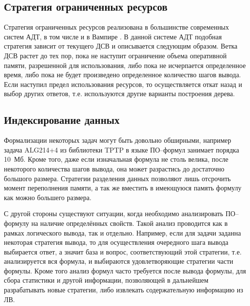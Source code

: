 

\subsection{Стратегия ограниченных ресурсов}
Стратегия ограниченных ресурсов реализована в большинстве современных систем АДТ, в том числе и в Вампире \cite{}. В данной системе АДТ подобная стратегия  зависит от текущего ДСВ и описывается следующим образом. Ветка ДСВ растет до тех пор, пока не наступит ограничение объема оперативной памяти, разрешенной для использования, либо пока не исчерпается определенное время, либо пока не будет произведено определенное количество шагов вывода. Если наступил предел использования ресурсов, то осуществляется откат назад и выбор других ответов, т.е. используются другие варианты построения дерева.

\subsection{Индексирование данных}

Формализации некоторых задач могут быть довольно обширными, например задача ALG214+4 из библиотеки TPTP в языке ПО--формул занимает порядка 10~Мб. Кроме того, даже если изначальная формула не столь велика, после некоторого количества шагов вывода, она может разрастись до достаточно большого размера. Стратегии разделения данных позволяют лишь отсрочить момент переполнения памяти, а так же вместить в имеющуюся память формулу как можно большего размера.

С другой стороны существуют ситуации, когда необходимо анализировать ПО--формулу на наличие определённых свойств. Такой анализ проводится как в рамках логического вывода, так и отдельно. Например, если для задачи заданна некоторая стратегия вывода, то для осуществления очередного шага вывода выбирается ответ, а значит база и вопрос, соответствующий этой стратегии, т.е. анализируется вся формула, и выбираются удовлетворяющие стратегии части формулы. Кроме того анализ формул часто требуется после вывода формулы, для сбора статистики и другой информации, позволяющей в дальнейшем разрабатывать новые стратегии, либо извлекать содержательную информацию из ЛВ.

